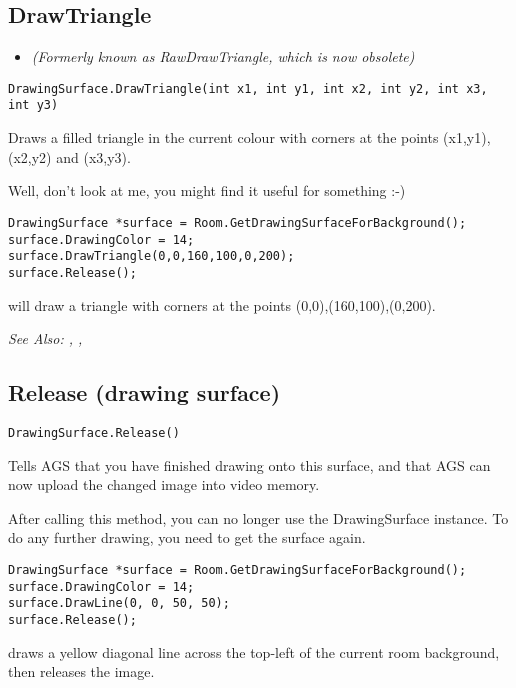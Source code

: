\subsection{DrawTriangle}\label{DrawingSurface.DrawTriangle}%

\begin{itemize}
\item \it{(Formerly known as RawDrawTriangle, which is now obsolete)}
\end{itemize}

\begin{verbatim}
DrawingSurface.DrawTriangle(int x1, int y1, int x2, int y2, int x3, int y3)
\end{verbatim}
Draws a filled triangle in the current colour with corners at the points
(x1,y1), (x2,y2) and (x3,y3).

Well, don't look at me, you might find it useful for something :-)

\begin{verbatim}
DrawingSurface *surface = Room.GetDrawingSurfaceForBackground();
surface.DrawingColor = 14;
surface.DrawTriangle(0,0,160,100,0,200);
surface.Release();
\end{verbatim}
will draw a triangle with corners at the points (0,0),(160,100),(0,200).

\it{See Also:} ,
 ,


\subsection{Release (drawing surface)}\label{DrawingSurface.Release}%

\begin{verbatim}
DrawingSurface.Release()
\end{verbatim}
Tells AGS that you have finished drawing onto this surface, and that AGS can now upload
the changed image into video memory.

After calling this method, you can no longer use the DrawingSurface instance. To do
any further drawing, you need to get the surface again.

\begin{verbatim}
DrawingSurface *surface = Room.GetDrawingSurfaceForBackground();
surface.DrawingColor = 14;
surface.DrawLine(0, 0, 50, 50);
surface.Release();
\end{verbatim}
draws a yellow diagonal line across the top-left of the current room background,
then releases the image.

